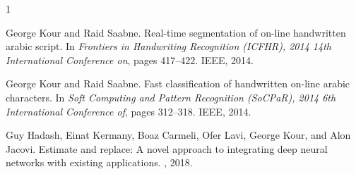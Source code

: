 \documentclass{article}
\begin{document}
\begin{thebibliography}{1}

George Kour and Raid Saabne.
\newblock Real-time segmentation of on-line handwritten arabic script.
\newblock In {\em Frontiers in Handwriting Recognition (ICFHR), 2014 14th
  International Conference on}, pages 417--422. IEEE, 2014.

George Kour and Raid Saabne.
\newblock Fast classification of handwritten on-line arabic characters.
\newblock In {\em Soft Computing and Pattern Recognition (SoCPaR), 2014 6th
  International Conference of}, pages 312--318. IEEE, 2014.

Guy Hadash, Einat Kermany, Boaz Carmeli, Ofer Lavi, George Kour, and Alon
  Jacovi.
\newblock Estimate and replace: A novel approach to integrating deep neural
  networks with existing applications.
, 2018.

\end{thebibliography}
\end{document}
